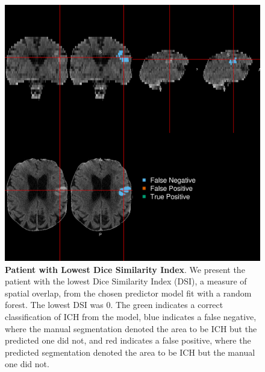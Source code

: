 \documentclass{elsarticle_nonatbib}\usepackage[]{graphicx}\usepackage[]{color}
\begin{document}
\begin{figure}
\centering
\includegraphics[width=0.75\linewidth,keepaspectratio]{Reseg_Figure_DSI_Quantile_000_native.png}
\caption{{\bf Patient with  Lowest Dice Similarity Index}. We present the patient with the lowest Dice Similarity Index (DSI), a measure of spatial overlap, from the chosen predictor model fit with a random forest.  The lowest DSI was 0. The green indicates a correct classification of ICH from the model, blue indicates a false negative, where the manual segmentation denoted the area to be ICH but the predicted one did not, and red indicates a false positive, where the predicted segmentation denoted the area to be ICH but the manual one did not. }
\label{fig:dice_img0}
\end{figure}
\end{document}
